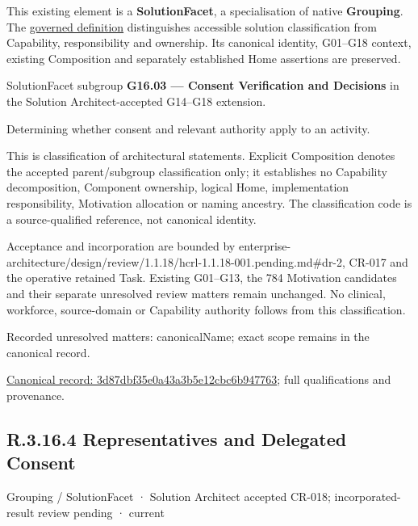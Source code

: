 This existing element is a \textbf{SolutionFacet}, a specialisation of native
\textbf{Grouping}. The \href{\detokenize{../../../../../../../governance/continuum-representation.md#solutionfacet-classification--1119-candidate}}{governed definition}
distinguishes accessible solution classification from Capability, responsibility
and ownership. Its canonical identity, G01–G18 context, existing Composition
and separately established Home assertions are preserved.



SolutionFacet subgroup \textbf{G16.03 — Consent Verification and Decisions} in the Solution Architect-accepted G14–G18 extension.



Determining whether consent and relevant authority apply to an activity.



This is classification of architectural statements. Explicit Composition denotes the accepted parent/subgroup classification only; it establishes no Capability decomposition, Component ownership, logical Home, implementation responsibility, Motivation allocation or naming ancestry. The classification code is a source-qualified reference, not canonical identity.



Acceptance and incorporation are bounded by enterprise-architecture/design/review/1.1.18/hcrl-1.1.18-001.pending.md\#dr-2, CR-017 and the operative retained Task. Existing G01–G13, the 784 Motivation candidates and their separate unresolved review matters remain unchanged. No clinical, workforce, source-domain or Capability authority follows from this classification.


{\small Recorded unresolved matters: canonicalName; exact scope remains in the canonical record.}\par
{\footnotesize \href{../../../../../../../continuum/grouping/3d87dbf35e0a43a3b5e12cbc6b947763.md}{Canonical record: 3d87dbf35e0a43a3b5e12cbc6b947763}; full qualifications and provenance.}\par
\subsection*{R.3.16.4 Representatives and Delegated Consent}
\label{navigation:R.3.16.4}

\label{element:392c07b6a5ba4fc7bd5c19910437da98}
{\small Grouping / SolutionFacet · Solution Architect accepted CR-018; incorporated-result review pending · current}\par

